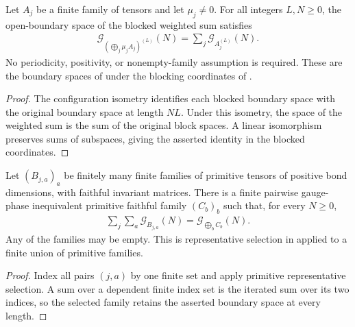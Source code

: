 \begin{lemma}
    \label{thm:blocking_joint_boundary_space}
    \leanok
    Let $A_j$ be a finite family of tensors and let $\mu_j\neq0$.
    For all integers $L,N\geq0$, the open-boundary space of the blocked
    weighted sum satisfies
    \begin{align}
        \mathcal G_{(\bigoplus_j\mu_jA_j)^{(L)}}(N)
        =\sum_j\mathcal G_{A_j^{(L)}}(N).
    \end{align}
    No periodicity, positivity, or nonempty-family assumption is required.
    These are the boundary spaces of
    \cite[Section~3]{Nachtergaele1996Spectral} under the blocking coordinates
    of \cite[Lemma~6]{DeLasCuevas2017Irreducible}.
\end{lemma}
\begin{proof}\leanok
    The configuration isometry identifies each blocked boundary space
    with the original boundary space at length $NL$. Under this isometry,
    the space of the weighted sum is the sum of the original block spaces.
    A linear isomorphism preserves sums of subspaces, giving the asserted
    identity in the blocked coordinates.
\end{proof}

\begin{lemma}
    \label{thm:primitive_nested_family_presentation}
    \leanok
    Let $(B_{j,a})_a$ be finitely many finite families of primitive tensors
    of positive bond dimensions, with faithful invariant matrices.
    There is a finite pairwise gauge-phase inequivalent primitive faithful
    family $(C_b)_b$ such that, for every $N\geq0$,
    \begin{align}
        \sum_j\sum_a\mathcal G_{B_{j,a}}(N)
        =\mathcal G_{\bigoplus_b C_b}(N).
    \end{align}
    Any of the families may be empty. This is representative selection
    in \cite[Proposition~2.7]{Cirac2016MPDO_arXiv}
    applied to a finite union of primitive families.
\end{lemma}
\begin{proof}\leanok
    Index all pairs $(j,a)$ by one finite set and apply primitive
    representative selection. A sum over a dependent finite index set
    is the iterated sum over its two indices, so the selected family
    retains the asserted boundary space at every length.
\end{proof}

